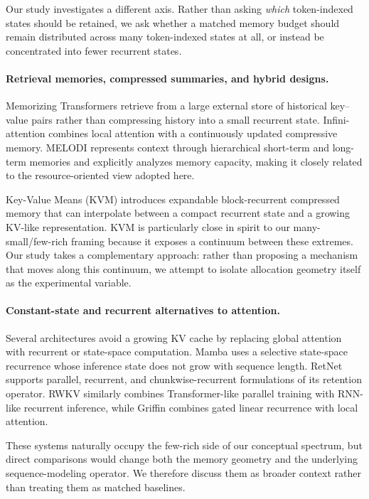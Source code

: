 \documentclass[10pt]{article} %
\begin{document}
Our study investigates a different axis. Rather than asking \emph{which}
token-indexed states should be retained, we ask whether a matched memory
budget should remain distributed across many token-indexed states at all,
or instead be concentrated into fewer recurrent states.

\paragraph{Retrieval memories, compressed summaries, and hybrid designs.}
Memorizing Transformers \citep{wu2022memorizing} retrieve from a large
external store of historical key--value pairs rather than compressing
history into a small recurrent state. Infini-attention
\citep{munkhdalai2024infini} combines local attention with a continuously
updated compressive memory. MELODI \citep{chen2024melodi} represents
context through hierarchical short-term and long-term memories and
explicitly analyzes memory capacity, making it closely related to the
resource-oriented view adopted here.

Key-Value Means (KVM) \citep{goldstein2026kvm} introduces expandable
block-recurrent compressed memory that can interpolate between a compact
recurrent state and a growing KV-like representation. KVM is particularly
close in spirit to our many-small/few-rich framing because it exposes a
continuum between these extremes. Our study takes a complementary
approach: rather than proposing a mechanism that moves along this
continuum, we attempt to isolate allocation geometry itself as the
experimental variable.

\paragraph{Constant-state and recurrent alternatives to attention.}
Several architectures avoid a growing KV cache by replacing global
attention with recurrent or state-space computation. Mamba
\citep{gu2023mamba} uses a selective state-space recurrence whose inference
state does not grow with sequence length. RetNet \citep{sun2023retnet}
supports parallel, recurrent, and chunkwise-recurrent formulations of its
retention operator. RWKV \citep{peng2023rwkv} similarly combines
Transformer-like parallel training with RNN-like recurrent inference,
while Griffin \citep{de2024griffin} combines gated linear recurrence with
local attention.

These systems naturally occupy the few-rich side of our conceptual
spectrum, but direct comparisons would change both the memory geometry and
the underlying sequence-modeling operator. We therefore discuss them as
broader context rather than treating them as matched baselines.
\end{document}
